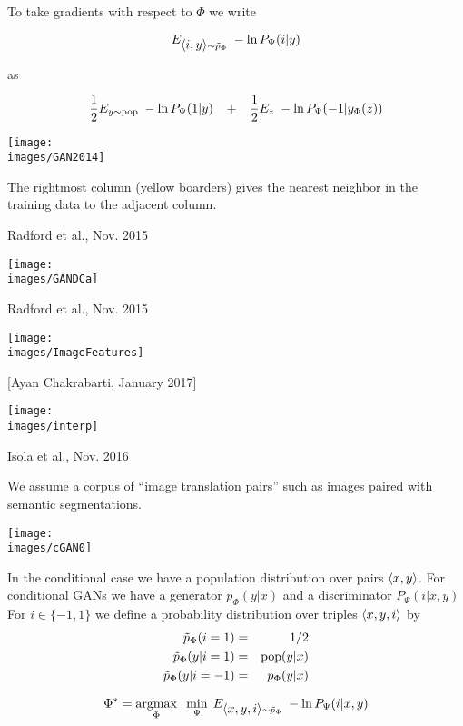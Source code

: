 {

To take gradients with respect to $\Phi$ we write

\vfill
$$E_{{\mbox{$\langle i,y\rangle$}} \sim \tilde{p}_\Phi}\;-\ln P_\Psi(i|y)$$

\vfill
as

\vfill
$$\frac{1}{2} E_{y \sim \mathrm{pop}}\;-\ln P_\Psi(1|y) \;\;\;+\;\;\; \frac{1}{2} E_z\;-\ln P_\Psi(-1|y_\Phi(z))$$

\centerline{\texttt{[image: \\images/GAN2014]}}
The rightmost column (yellow boarders) gives the nearest neighbor in the training data to the adjacent column.

{Radford et al., Nov. 2015}

\centerline{\texttt{[image: \\images/GANDCa]}}

{Radford et al., Nov. 2015}

\centerline{\texttt{[image: \\images/ImageFeatures]}}


[Ayan Chakrabarti, January 2017]

\centerline{\texttt{[image: \\images/interp]}}


{Isola et al., Nov. 2016}

We assume a corpus of ``image translation pairs'' such as images paired with semantic segmentations.

\centerline{\texttt{[image: \\images/cGAN0]}}

In the conditional case we have a population distribution over pairs ${\mbox{$\langle x,y\rangle$}}$.
For conditional GANs we have a generator $p_\Phi(y|x)$ and a discriminator $P_\Psi(i|x,y)$
For $i \in \{-1,1\}$ we define a probability distribution over triples
${\mbox{$\langle x,y,i\rangle$}}$ by
\begin{eqnarray*}
\tilde{p}_\Phi(i = 1) & = & 1/2 \\
\tilde{p}_\Phi(y|i=1) & =&  \mathrm{pop}(y|x) \\
\tilde{p}_\Phi(y|i=-1) & = & p_\Phi(y|x)
\end{eqnarray*}

{\color{red} $$\Phi^* = \operatorname*{argmax}_\Phi\;\;\min_\Psi\;E_{{\mbox{$\langle x,y,i\rangle$}} \sim \tilde{p}_\Phi}\;-\ln P_\Psi(i|x,y)$$}

}
